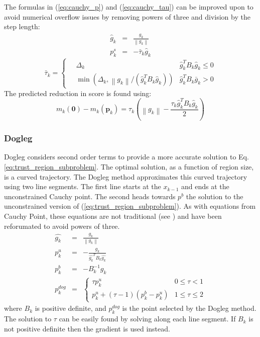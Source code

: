 \documentclass[peerreview,compsoc,onecolumn]{IEEEtran}
\newcommand{\norm}[1]{\left\lVert#1\right\rVert}
\begin{document}
The formulas in (\ref{eq:cauchy_p}) and (\ref{eq:cauchy_tau}) can be improved upon to avoid numerical overflow issues by removing powers of three and division by the step length:
\begin{eqnarray}
\hat{g}_k &=& \frac{g_k}{\norm{g_k}} \\
p^s_k &=& -\bar{\tau}_k \hat{g}_k
\end{eqnarray}
\begin{equation}
\bar{\tau}_k = \begin{cases}
		\quad \Delta_k & \hat{g}_k^T B_k \hat{g}_k\le 0 \\
		\quad \min\left(\Delta_k,\norm{g_k}/(\hat{g}_k^T B_k \hat{g}_k)\right) & \hat{g}_k^T B_k \bar{g}_k > 0
	\end{cases}
\end{equation}
The predicted reduction in score is found using:
\begin{equation}
m_k(\bm{0})-m_k(\bm{p}_k) = \tau_k\left(\norm{g_k} - \frac{\tau_k \hat{g}_k^T B_k \hat{g}_k}{2} \right)
\end{equation}


\subsubsection{Dogleg}
\label{section:dogleg}  

Dogleg considers second order terms to provide a more accurate solution to Eq. \ref{eq:trust_region_subproblem}. The optimal solution, as a function of region size, is a curved trajectory. The Dogleg method approximates this curved trajectory using two line segments. The first line starts at the $x_{k-1}$ and ends at the unconstrained Cauchy point. The second heads towards $p^b$ the solution to the unconstrained version of (\ref{eq:trust_region_subproblem}). As with equations from Cauchy Point, these equations are not traditional (see \cite{numopt2006,IMM2004}) and have been reforumated to avoid powers of three.
\begin{eqnarray}
\hat{g_k} &=& \frac{g_k}{\norm{g_k}} \\
p^u_k &=& -\frac{g_k}{\hat{g_k}^T B_k \hat{g_k}} \\
p^b_k &=& -B^{-1}_k g_k \\
p^{dog}_k &=&
\begin{cases}
	\tau p^u_k & 0 \le \tau < 1 \\
	p^u_k + (\tau -1)(p^b_k-p^u_k) & 1 \le \tau \le 2
\end{cases}
\end{eqnarray}
where $B_k$ is positive definite, and $p^{dog}_k$ is the point selected by the Dogleg method. The solution to $\tau$ can be easily found by solving along each line segment. If $B_k$ is not positive definite then the gradient is used instead.
\end{document}
